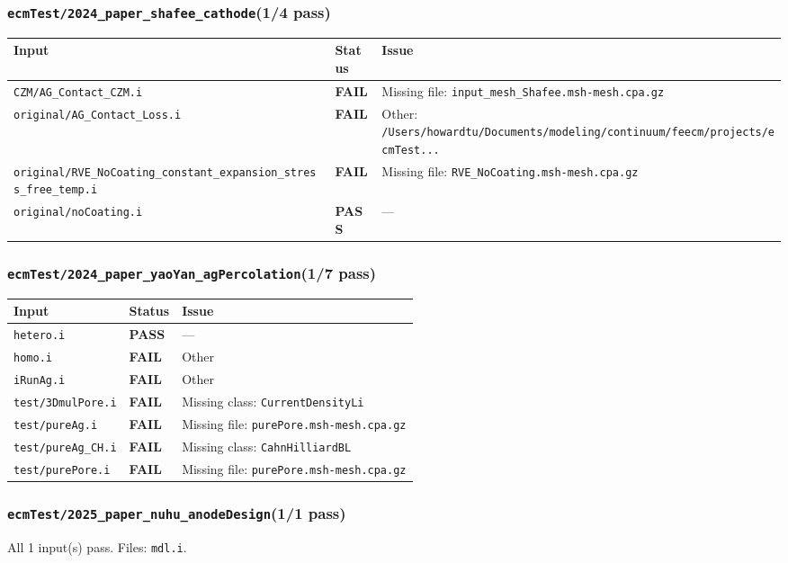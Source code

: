 \documentclass[10pt,letterpaper]{article}
\newcommand{\PASS}{\textcolor{passgreen}{\textbf{PASS}}}
\newcommand{\FAIL}{\textcolor{failred}{\textbf{FAIL}}}
\newcommand{\code}[1]{\texttt{\small #1}}
\begin{document}
\subsubsection{\code{ecmTest/2024\_paper\_shafee\_cathode}\hfill (1/4 pass)}
\begin{longtable}{p{} l p{}}
\toprule
Input & Status & Issue \\
\midrule
\endhead
\code{CZM/AG\_Contact\_CZM.i} & \FAIL & Missing file: \code{input\_mesh\_Shafee.msh-mesh.cpa.gz} \\
\code{original/AG\_Contact\_Loss.i} & \FAIL & Other: \code{/Users/howardtu/Documents/modeling/continuum/feecm/projects/ecmTest...} \\
\code{original/RVE\_NoCoating\_constant\_expansion\_stress\_free\_temp.i} & \FAIL & Missing file: \code{RVE\_NoCoating.msh-mesh.cpa.gz} \\
\code{original/noCoating.i} & \PASS & --- \\
\bottomrule
\end{longtable}

\subsubsection{\code{ecmTest/2024\_paper\_yaoYan\_agPercolation}\hfill (1/7 pass)}
\begin{longtable}{p{} l p{}}
\toprule
Input & Status & Issue \\
\midrule
\endhead
\code{hetero.i} & \PASS & --- \\
\code{homo.i} & \FAIL & Other \\
\code{iRunAg.i} & \FAIL & Other \\
\code{test/3DmulPore.i} & \FAIL & Missing class: \code{CurrentDensityLi} \\
\code{test/pureAg.i} & \FAIL & Missing file: \code{purePore.msh-mesh.cpa.gz} \\
\code{test/pureAg\_CH.i} & \FAIL & Missing class: \code{CahnHilliardBL} \\
\code{test/purePore.i} & \FAIL & Missing file: \code{purePore.msh-mesh.cpa.gz} \\
\bottomrule
\end{longtable}

\subsubsection{\code{ecmTest/2025\_paper\_nuhu\_anodeDesign}\hfill (1/1 pass)}
All 1 input(s) pass. Files: \code{mdl.i}.
\end{document}

